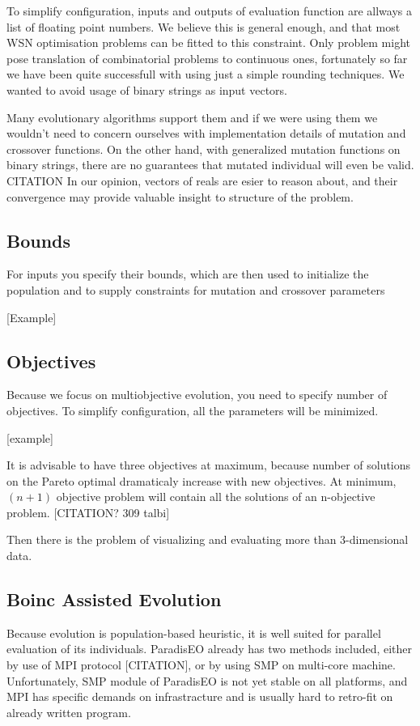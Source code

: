 \documentclass[12pt,oneside,draft]{fithesis2}
\begin{document}
To simplify configuration, inputs and outputs of evaluation function are allways a list of floating point numbers. We believe this is general enough, and that most WSN optimisation problems can be fitted to this constraint. Only problem might pose translation of combinatorial problems to continuous ones, fortunately so far we have been quite successfull with using just a simple rounding techniques. We wanted to avoid usage of binary strings as input vectors.

Many evolutionary algorithms support them and if we were using them we wouldn't need to concern ourselves with implementation details of mutation and crossover functions. On the other hand, with generalized mutation functions on binary strings, there are no guarantees that mutated individual will even be valid. CITATION In our opinion, vectors of reals are esier to reason about, and their convergence may provide valuable insight to structure of the problem.

\subsection{Bounds}
For inputs you specify their bounds, which are then used to initialize the population and to supply constraints for mutation and crossover parameters

[Example]

\subsection{Objectives}

Because we focus on multiobjective evolution, you need to specify number of objectives. To simplify configuration, all the parameters will be minimized.

[example]

It is advisable to have three objectives at maximum, because number of solutions on the Pareto optimal dramaticaly increase with new objectives.
At minimum, $(n+1)$ objective problem will contain all the solutions of an n-objective problem. [CITATION? 309 talbi]

Then there is the problem of visualizing and evaluating more than 3-dimensional data.

\subsection{Boinc Assisted Evolution}

Because evolution is population-based heuristic, it is well suited for parallel evaluation of its individuals. ParadisEO already has two methods included, either by use of MPI protocol [CITATION], or by using SMP on multi-core machine. Unfortunately, SMP module of ParadisEO is not yet stable on all platforms, and MPI has specific demands on infrastracture and is usually hard to retro-fit on already written program. 
\end{document}

